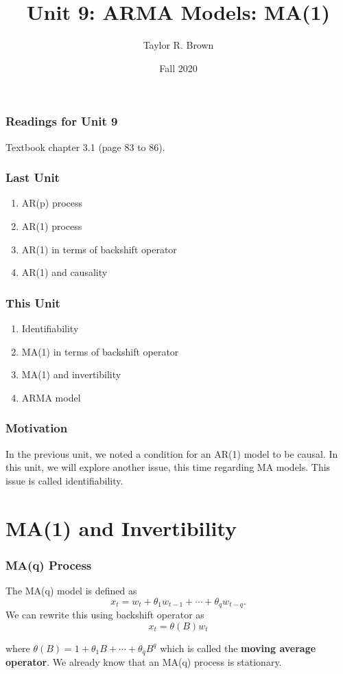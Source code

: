 \documentclass[%
xcolor=pdftex]{beamer}
\title{Unit 9: ARMA Models: MA(1)}
\author[STAT 5170: Applied Time Series, Unit 9]{Taylor R. Brown}
\institute{Department of Statistics, University of Virginia}
\date{Fall 2020}
\begin{document}
\frame{\titlepage}


\begin{frame}
\frametitle{Readings for Unit 9}

Textbook chapter 3.1 (page 83 to 86).

\end{frame}


\begin{frame}
\frametitle{Last Unit}

\begin{enumerate}
\item AR(p) process
\item AR(1) process
\item AR(1) in terms of backshift operator
\item AR(1) and causality
\end{enumerate}

\end{frame}

\begin{frame}
\frametitle{This Unit}
\begin{enumerate}
\item Identifiability
\item MA(1) in terms of backshift operator
\item MA(1) and invertibility
\item ARMA model
\end{enumerate}
\end{frame}

\begin{frame}
\frametitle{Motivation}

In the previous unit, we noted a condition for an AR(1) model to be causal. In this unit, we will explore another issue, this time regarding MA models. This issue is called identifiability.

\end{frame}

\section{MA(1) and Invertibility}
\frame{\tableofcontents[currentsection]}

\begin{frame}
\frametitle{MA(q) Process}

The MA(q) model is defined as
$$
x_t=w_t + \theta_1 w_{t-1}+ \cdots + \theta_q w_{t-q}.
$$
We can rewrite this using backshift operator as
\begin{equation} \label{eq:MA}
x_t=\theta(B) w_t
\end{equation}

 where $\theta(B)=1+\theta_1 B+ \cdots +\theta_q B^q$ which is called the \textbf{moving average operator}. We already know that an MA(q) process is stationary.

\end{frame}
\end{document}
